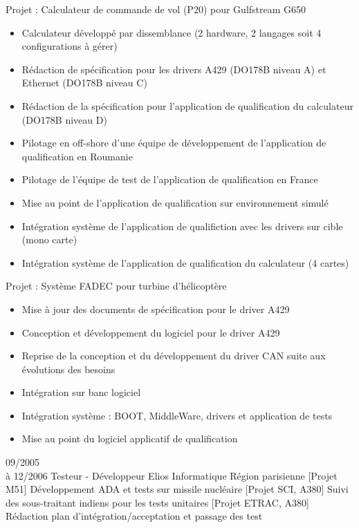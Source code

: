 \documentclass[10pt,a4paper]{moderncv}       %
\begin{document}
{
Projet : Calculateur de commande de vol (P20) pour Gulfstream G650
\begin{itemize}
\setlength{\itemindent}{2mm}
  \item Calculateur développé par dissemblance (2 hardware, 2 langages soit 4 configurations à gérer)
  \item Rédaction de spécification pour les drivers A429 (DO178B niveau A) et Ethernet (DO178B niveau C)
  \item Rédaction de la spécification pour l'application de qualification du calculateur (DO178B niveau D)
  \item Pilotage en off-shore d'une équipe de développement de l'application de qualification en Roumanie
  \item Pilotage de l'équipe de test de l'application de qualification en France
  \item Mise au point de l'application de qualification sur environnement simulé
  \item Intégration système de l'application de qualifiction avec les drivers sur cible (mono carte)
  \item Intégration système de l'application de qualification du calculateur (4 cartes)
\end{itemize}
Projet : Système FADEC pour turbine d'hélicoptère
\begin{itemize}
\setlength{\itemindent}{2mm}
  \item Mise à jour des documents de spécification pour le driver A429
  \item Conception et développement du logiciel pour le driver A429
  \item Reprise de la conception et du développement du driver CAN suite aux évolutions des besoins
  \item Intégration sur banc logiciel
  \item Intégration système : BOOT, MiddleWare, drivers et application de tests
  \item Mise au point du logiciel applicatif de qualification
\end{itemize}
}
\vspace*{3mm}
\cventry
{09/2005\\à 12/2006}    %
{Testeur - Développeur} %
{Elios Informatique}    %
{Région parisienne}     %
{}                      %
{
[Projet M51] Développement ADA et tests sur missile nucléaire
\newline{}
[Projet SCI, A380] Suivi des sous-traitant indiens pour les tests unitaires
\newline{}
[Projet ETRAC, A380] Rédaction plan d’intégration/acceptation et passage
  des test
}
\end{document}
